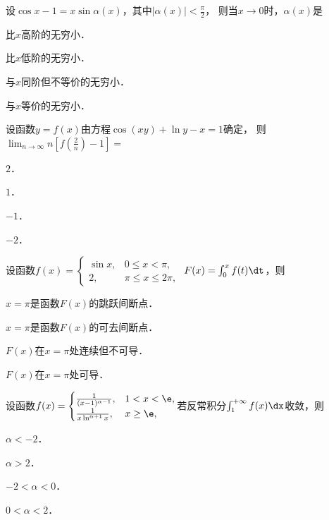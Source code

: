 \documentclass[plain,noanswer,medmath]{../../template/jnuexam}
\begin{document}






\begin{problem}
设$\cos x - 1 = x\sin \alpha(x)$，其中$\left| \alpha(x) \right| < \frac{\pi}{2}$，
则当$x \to 0$时，$\alpha (x)$是\pickout{}
\begin{abcd}
\item 比$x$高阶的无穷小．
\item 比$x$低阶的无穷小．
\item 与$x$同阶但不等价的无穷小．
\item 与$x$等价的无穷小．
\end{abcd}
\end{problem}


\begin{problem}
设函数$y = f(x)$由方程$\cos (xy) + \ln y - x = 1$确定，
则$\lim_{n \to \infty} n\left[f\left(\frac{2}{n} \right) - 1 \right] =$\pickout{}
\begin{abcd}
\item $2$．
\item $1$．
\item $- 1$．
\item $- 2$．
\end{abcd}
\end{problem}


\begin{problem}
设函数$f(x) = \begin{cases}
  \sin x, & 0 \le x < \pi , \\
       2, & \pi \le x \le 2\pi ,
\end{cases}$ $F(x) = \int_0^x f(t) \dt$，则\pickout{}
\begin{abcd}
\item $x = \pi$是函数$F(x)$的跳跃间断点．
\item $x = \pi$是函数$F(x)$的可去间断点．
\item $F(x)$在$x = \pi$处连续但不可导．
\item $F(x)$在$x = \pi$处可导．
\end{abcd}
\end{problem}


\begin{problem}
设函数$f(x) =\begin{cases}
  \frac{1}{(x - 1)^{\alpha - 1}}, & 1 < x < \e, \\
   \frac{1}{x\ln^{\alpha + 1} x}, & x \ge \e,
\end{cases}$若反常积分$\int_1^{+\infty} f(x) \dx$收敛，则\pickout{}
\begin{abcd}
\item $\alpha < - 2$．
\item $\alpha > 2$．
\item $- 2 < \alpha < 0$．
\item $0 < \alpha < 2$．
\end{abcd}
\end{problem}
\end{document}
